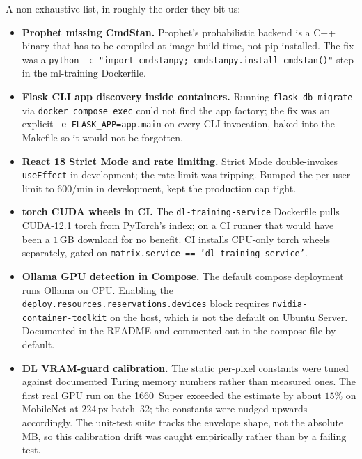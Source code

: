 \documentclass[12pt, a4paper, oneside]{report}
\begin{document}
A non-exhaustive list, in roughly the order they bit us:

\begin{itemize}
    \item \textbf{Prophet missing CmdStan.} Prophet's probabilistic
        backend is a C++ binary that has to be compiled at
        image-build time, not pip-installed. The fix was a
        \texttt{python -c "import\,cmdstanpy;\,cmdstanpy.install\_cmdstan()"}
        step in the ml-training Dockerfile.
    \item \textbf{Flask CLI app discovery inside containers.}
        Running \texttt{flask db migrate} via \texttt{docker compose
        exec} could not find the app factory; the fix was an
        explicit \texttt{-e FLASK\_APP=app.main} on every CLI
        invocation, baked into the Makefile so it would not be
        forgotten.
    \item \textbf{React 18 Strict Mode and rate limiting.} Strict
        Mode double-invokes \texttt{useEffect} in development; the
        rate limit was tripping. Bumped the per-user limit to
        $600$/min in development, kept the production cap tight.
    \item \textbf{torch CUDA wheels in CI.} The
        \texttt{dl-training-service} Dockerfile pulls CUDA-12.1
        torch from PyTorch's index; on a CI runner that would have
        been a $1$\,GB download for no benefit. CI installs
        CPU-only torch wheels separately, gated on
        \texttt{matrix.service == 'dl-training-service'}.
    \item \textbf{Ollama GPU detection in Compose.} The default
        compose deployment runs Ollama on CPU. Enabling the
        \texttt{deploy.resources.reservations.devices} block
        requires \texttt{nvidia-container-toolkit} on the host,
        which is not the default on Ubuntu Server. Documented in
        the README and commented out in the compose file by
        default.
    \item \textbf{DL VRAM-guard calibration.} The static per-pixel
        constants were tuned against documented Turing memory
        numbers rather than measured ones. The first real GPU run
        on the 1660~Super exceeded the estimate by about $15\%$ on
        MobileNet at 224\,px batch~32; the constants were nudged
        upwards accordingly. The unit-test suite tracks the
        envelope shape, not the absolute MB, so this calibration
        drift was caught empirically rather than by a failing
        test.
\end{itemize}
\end{document}
